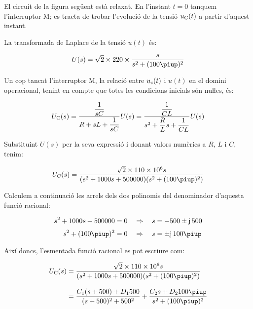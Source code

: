 	
\begin{exemple}\label{ex:CircuitLaplaceNul}	
	\addcontentsxms{\CircuitLaplaceNul}
    El circuit de la figura següent està relaxat. En l'instant $t=0$
    tanquem l'interruptor M; es tracta de trobar l'evolució de la tensió
    $u_\mathrm{C}(t)$ a partir d'aquest instant.

    \begin{center}
        
    \end{center}

    La transformada de Laplace de la tensió $u(t)$ és:

    \[
        U(s) = \sqrt{2}\times 220\times \frac{s}{s^2 + (100\piup)^2}
    \]

    Un cop tancat l'interruptor M, la relació entre $u_\mathrm{c}(t)$ i
    $u(t)$ en el domini operacional, tenint en compte que totes les
    condicions inicials són nuŀles, és:

    \[
        U_\mathrm{C}(s) = \frac{\dfrac{1}{sC}}{R+ sL +\dfrac{1}{sC}} U(s)=
        \frac{\dfrac{1}{CL}}{s^2 + \dfrac{R}{L}s +\dfrac{1}{CL}} U(s)
    \]

    Substituint $U(s)$ per la seva expressió i donant valors numèrics a
    $R$, $L$ i $C$, tenim:

    \[
        U\ped{C}(s) = \frac{\sqrt{2}\times 110\times 10^6 s}{(s^2 + 1000 s + 500000)(s^2 + (100\piup)^2)}
    \]

    Calculem a continuació les arrels dels dos polinomis  del
    denominador d'aquesta funció racional:

    \begin{align*}
        s^2 + 1000 s + 500000 &= 0 \quad\Rightarrow\quad s = -500
        \pm\ju\,500 \\[0.5ex]
        s^2 + (100\piup)^2 &= 0 \quad\Rightarrow\quad s = \pm\ju\,100\piup
    \end{align*}

    Així doncs, l'esmentada funció racional es pot escriure com:

    \[\begin{split}
    U\ped{C}(s) &= \frac{\sqrt{2}\times 110\times 10^6 s}{(s^2 + 1000 s +
    500000)(s^2 + (100\piup)^2)}   \\[2ex] &= \frac{C_1 (s+500) + D_1
    500}{(s+500)^2+500^2} + \frac{C_2 s + D_2 100 \piup}{s^2 +(100\piup)^2}
    \end{split}\]


\end{exemple}
